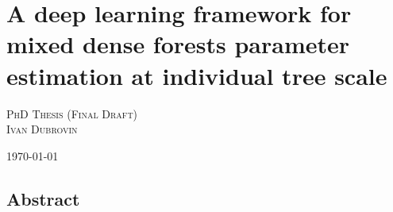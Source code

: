 \chapter*{A deep learning framework for mixed dense forests parameter estimation at individual tree scale}

\begin{center}
\Large{
\textsc{PhD Thesis (Final Draft) \\ Ivan Dubrovin \\ }
}

\today\ \currenttime
\end{center}

\clearpage

\section*{Abstract}




\listoftodos
\clearpage